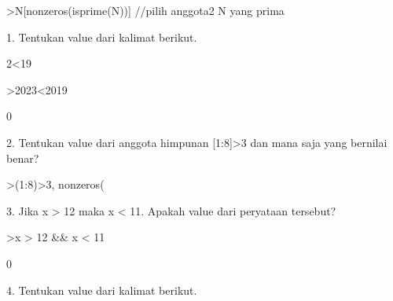 \documentclass[a4paper,10pt]{article}
\begin{document}
\begin{eulernotebook}
\begin{eulercomment}
\begin{eulercomment}
\begin{eulercomment}
\begin{eulercomment}
\begin{euleroutput}
  [2,  3,  5,  7,  9,  11,  13,  15,  17,  19,  21,  23,  25,  27,  29,
  31,  33,  35,  37,  39,  41,  43,  45,  47,  49,  51,  53,  55,  57,
  59,  61,  63,  65,  67,  69,  71,  73,  75,  77,  79,  81,  83,  85,
  87,  89,  91,  93,  95,  97,  99]
\end{euleroutput}
\begin{eulerprompt}
>N[nonzeros(isprime(N))] //pilih anggota2 N yang prima
\end{eulerprompt}
\begin{euleroutput}
  [2,  3,  5,  7,  11,  13,  17,  19,  23,  29,  31,  37,  41,  43,  47,
  53,  59,  61,  67,  71,  73,  79,  83,  89,  97]
\end{euleroutput}
\begin{eulercomment}
1. Tentukan value dari kalimat berikut.

2\textless{}19
\end{eulercomment}
\begin{eulerprompt}
>2023<2019
\end{eulerprompt}
\begin{euleroutput}
  0
\end{euleroutput}
\begin{eulercomment}
2. Tentukan value dari anggota himpunan [1:8]\textgreater{}3 dan mana saja yang
bernilai benar?
\end{eulercomment}
\begin{eulerprompt}
>(1:8)>3, nonzeros(%
\end{eulerprompt}
\begin{euleroutput}
  [0,  0,  0,  1,  1,  1,  1,  1]
  [4,  5,  6,  7,  8]
\end{euleroutput}
\begin{eulercomment}
3. Jika x \textgreater{} 12 maka x \textless{} 11. Apakah value dari peryataan tersebut?
\end{eulercomment}
\begin{eulerprompt}
>x > 12 && x < 11
\end{eulerprompt}
\begin{euleroutput}
  0
\end{euleroutput}
\begin{eulercomment}
4. Tentukan value dari kalimat berikut.


\end{eulercomment}
\end{eulercomment}
\end{eulercomment}
\end{eulercomment}
\end{eulercomment}
\end{eulernotebook}
\end{document}
